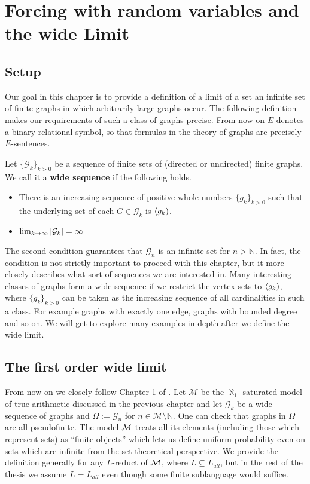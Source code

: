 \chapter{Forcing with random variables and the wide Limit}\label{chapwidelimit}
\section{Setup}

Our goal in this chapter is to provide a definition of a limit of a set an infinite set of finite graphs in which arbitrarily large graphs occur. The following definition makes our requirements of such a class of graphs precise. From now on $E$ denotes a binary relational symbol, so that formulas in the theory of graphs are precisely $E$-sentences.

\begin{defi}
Let $\{\mathcal{G}_k\}_{k>0}$ be a sequence of finite sets of (directed or undirected) finite graphs. We call it a \textbf{wide sequence} if the following holds.

\begin{itemize}
\item There is an increasing sequence of positive whole numbers $\{g_k\}_{k>0}$ such that the underlying set of each $G\in\mathcal{G}_k$ is $\langle g_k)$.
\item $\lim_{k\to\infty} \left|{\mathcal{G}_k}\right|=\infty$
\end{itemize}
\end{defi}

The second condition guarantees that $\mathcal{G}_n$ is an infinite set for $n>\mathbb{N}$. In fact, the condition is not strictly important to proceed with this chapter, but it more closely describes what sort of sequences we are interested in. Many interesting classes of graphs form a wide sequence if we restrict the vertex-sets to $\langle g_k)$, where $\{g_k\}_{k>0}$ can be taken as the increasing sequence of all cardinalities in such a class. For example graphs with exactly one edge, graphs with bounded degree and so on. We will get to explore many examples in depth after we define the wide limit.

\section{The first order wide limit}

From now on we closely follow Chapter 1 of \cite{krajicek2010forcing}. Let $\mathcal{M}$ be the $\aleph_1$-saturated model of true arithmetic discussed in the previous chapter and let $\mathcal{G}_k$ be a wide sequence of graphs and $\Omega:=\mathcal{G}_n$ for $n\in\mathcal{M}\setminus \mathbb{N}$. One can check that graphs in $\Omega$ are all pseudofinite. The model $\mathcal{M}$ treats all its elements (including those which represent sets) as ``finite objects'' which lets us define uniform probability even on sets which are infinite from the set-theoretical perspective. We provide the definition generally for any $L$-reduct of $\mathcal{M}$, where $L\subseteq L_{all}$, but in the rest of the thesis we assume $L=L_{all}$ even though some finite sublanguage would suffice.


